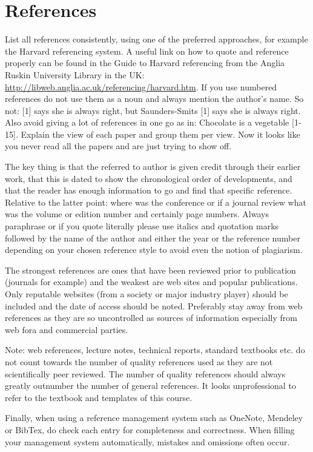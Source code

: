 \documentclass[12pt, english, NoHyper]{AE4010-template}
\begin{document}
\section{References}
List all references consistently, using one of the preferred approaches, for example the Harvard referencing system. A useful link on how to quote and reference properly can be found in the Guide to Harvard referencing from the Anglia Ruskin University Library in the UK: \url{http://libweb.anglia.ac.uk/referencing/harvard.htm}. If you use numbered references do not use them as a noun and always mention the author’s name. So not: [1] says she is always right, but Saunders-Smits [1] says she is always right. Also avoid giving a lot of references in one go as in: Chocolate is a vegetable [1- 15]. Explain the view of each paper and group them per view. Now it looks like you never read all the papers and are just trying to show off.

The key thing is that the referred to author is given credit through their earlier work, that this is dated to show the chronological order of developments, and that the reader has enough information to go and find that specific reference. Relative to the latter point: where was the conference or if a journal review what was the volume or edition number and certainly page numbers. Always paraphrase or if you quote literally please use italics and quotation marks followed by the name of the author and either the year or the reference number depending on your chosen reference style to avoid even the notion of plagiarism.

The strongest references are ones that have been reviewed prior to publication (journals for example) and the weakest are web sites and popular publications. Only reputable websites (from a society or major industry player) should be included and the date of access should be noted. Preferably stay away from web references as they are so uncontrolled as sources of information especially from web fora and commercial parties.

Note: web references, lecture notes, technical reports, standard textbooks etc. do not count towards the number of quality references used as they are not scientifically peer reviewed. The number of quality references should always greatly outnumber the number of general references. It looks unprofessional to refer to the textbook and templates of this course.

Finally, when using a reference management system such as OneNote, Mendeley or BibTex, do check each entry for completeness and correctness. When filling your management system automatically, mistakes and omissions often occur. \newline
\end{document}
